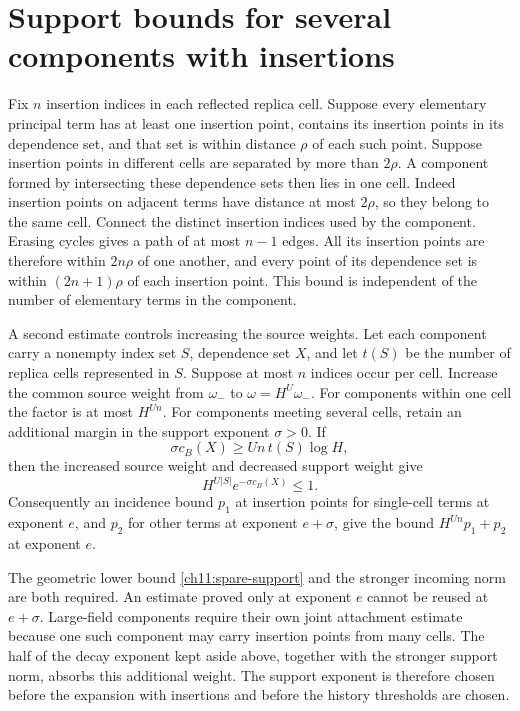 \section{Support bounds for several components with insertions}

Fix $n$ insertion indices in each reflected replica cell. Suppose every
elementary principal term has at least one insertion point, contains its
insertion points in its dependence set, and that set is within
distance $\rho$ of each such point. Suppose insertion points in different
cells are separated by more than $2\rho$.
A component formed by intersecting these dependence sets then lies in one
cell. Indeed insertion points on adjacent terms have distance at most $2\rho$,
so they belong to the same cell. Connect the distinct insertion indices used by
the component. Erasing cycles gives a path of at most $n-1$ edges.
All its insertion points are therefore within $2n\rho$ of one another,
and every point of its dependence set is within $(2n+1)\rho$ of each
insertion point. This bound is independent of the number of elementary
terms in the component.

A second estimate controls increasing the source weights. Let each
component carry a nonempty index set $S$, dependence set $X$, and let
$t(S)$ be the number of replica cells represented in $S$.
Suppose at most $n$ indices occur per cell. Increase the common source
weight from $\omega_-$ to $\omega=H^U\omega_-$.
For components within one cell the factor is at most $H^{Un}$.
For components meeting several cells, retain an additional margin in the support exponent
$\sigma>0$. If
\begin{equation}
 \sigma c_B(X)\ge Un\,t(S)\log H,
 \label{ch11:spare-support}
\end{equation}
then the increased source weight and decreased support weight give
\[
 H^{U|S|}e^{-\sigma c_B(X)}\le1.
\]
Consequently an incidence bound $p_1$ at insertion points for single-cell terms
at exponent $e$, and $p_2$ for other terms at exponent $e+\sigma$,
give the bound $H^{Un}p_1+p_2$ at exponent $e$.

The geometric lower bound \eqref{ch11:spare-support} and the stronger
incoming norm are both required. An estimate proved only at exponent
$e$ cannot be reused at $e+\sigma$. Large-field components require
their own joint attachment estimate because one such component may
carry insertion points from many cells. The half of the decay exponent kept aside above, together
with the stronger support norm, absorbs this additional weight.
The support exponent is therefore chosen before the expansion with insertions
and before the history thresholds are chosen.

